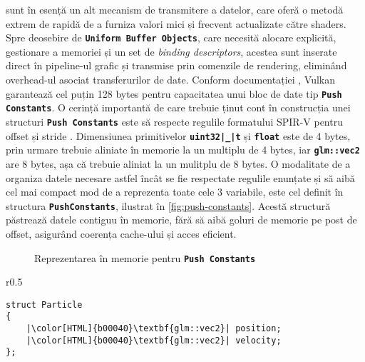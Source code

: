  sunt în esență un alt mecanism de transmitere a datelor, care oferă o metodă extrem de rapidă de a furniza valori mici și frecvent actualizate către shaders. Spre deosebire de \textbf{\texttt{Uniform Buffer Objects}}, care necesită alocare explicită, gestionare a memoriei și un set de \textit{binding descriptors}, acestea sunt inserate direct în pipeline-ul grafic și transmise prin comenzile de rendering, eliminând overhead-ul asociat transferurilor de date. Conform documentației \cite{PushConstantsSizeLimits_citation}, Vulkan garantează cel puțin 128 bytes pentru capacitatea unui bloc de date tip \textbf{\texttt{Push Constants}}. O cerință importantă de care trebuie ținut cont în construcția unei structuri \textbf{\texttt{Push Constants}} este să respecte regulile formatului SPIR-V pentru offset și stride \cite{Offset-and-Stride-Assignment_citation}. Dimensiunea primitivelor \textbf{\texttt{uint32|\textcolor{black}{\_}|t}} și \textbf{\texttt{float}} este de 4 bytes, prin urmare trebuie aliniate în memorie la un multiplu de 4 bytes, iar \textbf{\texttt{glm::vec2}} are 8 bytes, așa că trebuie aliniat la un mulitplu de 8 bytes. O modalitate de a organiza datele necesare astfel încât se fie respectate regulile enunțate și să aibă cel mai compact mod de a reprezenta toate cele 3 variabile, este cel definit în structura \textbf{\texttt{PushConstants}}, ilustrat în \autoref{fig:push-constants}. Acestă structură păstrează datele contiguu în memorie, fără să aibă goluri de memorie pe post de offset, asigurând coerența cache-ului și acces eficient. 

\begin{figure}
    \centering
    
    \caption{Reprezentarea în memorie pentru \textbf{\texttt{Push Constants}}}
    \label{fig:push-constants}
\end{figure}

\vspace{1em}
\begin{wrapfigure}{r}{0.5\textwidth}
\vspace{-1em}
\hspace{1.2cm}
\begin{minipage}{\linewidth}
\begin{verbatim}
struct Particle
{
    |\color[HTML]{b00040}\textbf{glm::vec2}| position;
    |\color[HTML]{b00040}\textbf{glm::vec2}| velocity;
};
\end{verbatim}
\end{minipage}
\vspace{-1em}
\end{wrapfigure}

